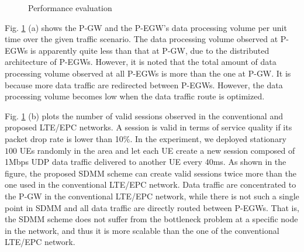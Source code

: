 \documentclass[runningheads,a4paper]{llncs}
\begin{document}
\begin{figure}[t] 
\centering 
{}
\caption{Performance evaluation}
\label{fig:3}
\end{figure}

Fig. \ref{fig:3} (a) shows the P-GW and the P-EGW's data processing volume per unit time over the given traffic scenario. The data processing volume observed at P-EGWs is apparently quite less than that at P-GW, due to the distributed architecture of P-EGWs. However, it is noted that the total amount of data processing volume observed at all P-EGWs is more than the one at P-GW. It is because more data traffic are redirected between P-EGWs. However, the data processing volume becomes low when the data traffic route is optimized.

Fig. \ref{fig:3} (b) plots the number of valid sessions observed in the conventional and proposed LTE/EPC networks. A session is valid in terms of service quality if its packet drop rate is lower than 10$\%$. In the experiment, we deployed stationary $100$ UEs randomly in the area and let each UE create a new session composed of 1Mbps UDP data traffic delivered to another UE every 40ms. As shown in the figure, the proposed SDMM scheme can create valid sessions twice more than the one used in the conventional LTE/EPC network. Data traffic are concentrated to the P-GW in the conventional LTE/EPC network, while there is not such a single point in SDMM and all data traffic are directly routed between P-EGWs. That is, the SDMM scheme does not suffer from the bottleneck problem at a specific node in the network, and thus it is more scalable than the one of the conventional LTE/EPC network. 
\end{document}
